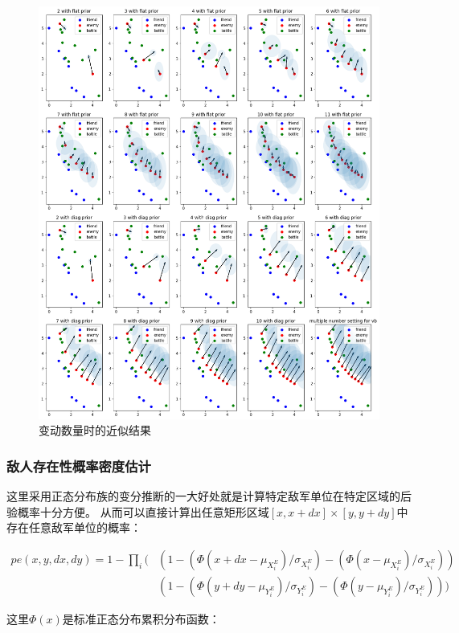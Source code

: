 \documentclass{sicnuthesis}
\begin{document}
\begin{figure}[htb]
\includegraphics[width=0.99\linewidth]{big_vb.png}
\caption{变动数量时的近似结果}
\label{fig:bigVb}
\end{figure}

\subsubsection{敌人存在性概率密度估计}


这里采用正态分布族的变分推断的一大好处就是计算特定敌军单位在特定区域的后验概率十分方便。
从而可以直接计算出任意矩形区域$[x,x+dx]\times[y,y+dy]$中存在任意敌军单位的概率：

\begin{align*}
pe(x,y,dx,dy) = 1 - \prod_i (
& (1-(\Phi(x+dx - \mu_{X^E_i})/\sigma_{X^E_i}) -  (\Phi(x - \mu_{X^E_i})/\sigma_{X^E_i})) \\
& (1-(\Phi(y+dy - \mu_{Y^E_i})/\sigma_{Y^E_i}) -  (\Phi(y - \mu_{Y^E_i})/\sigma_{Y^E_i}))
)
\end{align*}


这里$\Phi(x)$是标准正态分布累积分布函数：
\end{document}
